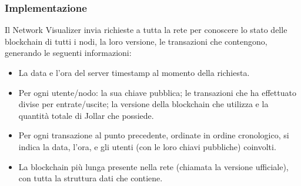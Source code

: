 \subsubsection{Implementazione}
Il Network Visualizer invia richieste a tutta la rete per conoscere lo stato delle blockchain di tutti i nodi, la loro versione, le transazioni che contengono, generando le seguenti informazioni:
\begin{itemize}
    \item La data e l'ora del server timestamp al momento della richiesta.
    \item Per ogni utente/nodo: la sua chiave pubblica; le transazioni che ha effettuato divise per entrate/uscite; la versione della blockchain che utilizza e la quantità totale di Jollar che possiede.
    \item Per ogni transazione al punto precedente, ordinate in ordine cronologico, si indica la data, l'ora, e gli utenti (con le loro chiavi pubbliche) coinvolti.
    \item La blockchain più lunga presente nella rete (chiamata la versione ufficiale), con tutta la struttura dati che contiene.
\end{itemize}